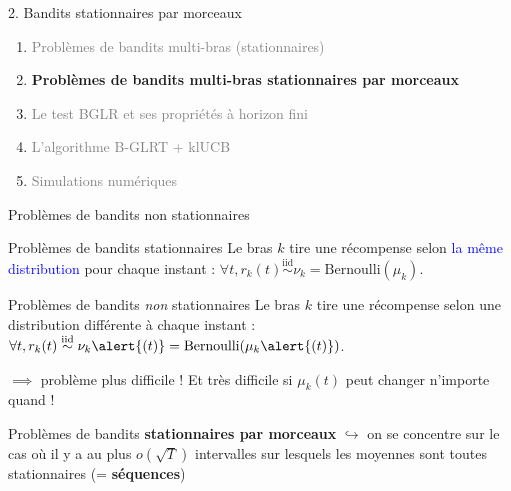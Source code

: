 \documentclass[11pt,french,ignorenonframetext,]{beamer}
\begin{document}
\begin{frame}{2. Bandits stationnaires par morceaux}

  \begin{enumerate}
    \item
    \textcolor{gray}{
      Problèmes de bandits multi-bras (stationnaires)
    }
    \vspace*{15pt}

    \item
    \alert{\textbf{%
      Problèmes de bandits multi-bras stationnaires par morceaux
    }}
    \vspace*{15pt}

    \item
    \textcolor{gray}{
      Le test BGLR et ses propriétés à horizon fini
    }
    \vspace*{15pt}

    \item
    \textcolor{gray}{
      L'algorithme B-GLRT + klUCB
    }
    \vspace*{15pt}


    \item
    \textcolor{gray}{
      Simulations numériques
    }
  \end{enumerate}

\end{frame}


\begin{frame}{Problèmes de bandits non stationnaires}

  \begin{block}{Problèmes de bandits stationnaires}
    Le bras $k$ tire une récompense selon \textcolor{blue}{la même distribution} pour chaque instant :
    $\forall t, r_k(t) \overset{\text{iid}}{\sim} \nu_k = \mathrm{Bernoulli}(\mu_k)$.
  \end{block}

  \pause
  \begin{alertblock}{Problèmes de bandits \emph{non} stationnaires}
    Le bras $k$ tire une récompense selon \alert{une distribution différente à chaque instant} :
    $\forall t, r_k(t) \overset{\text{iid}}{\sim} \nu_k\alert{(t)} = \mathrm{Bernoulli}(\mu_k\alert{(t)})$.
  \end{alertblock}

  $\implies$ \dXey{} problème plus difficile !
  Et très difficile si $\mu_k(t)$ peut changer n'importe quand !

  \pause
  \begin{block}{Problèmes de bandits \textbf{stationnaires par morceaux}}
    $\hookrightarrow$ on se concentre sur le cas où il y a au plus $o(\sqrt{T})$ intervalles sur lesquels les moyennes sont toutes stationnaires (= \textbf{séquences})
  \end{block}
\end{frame}
\end{document}
